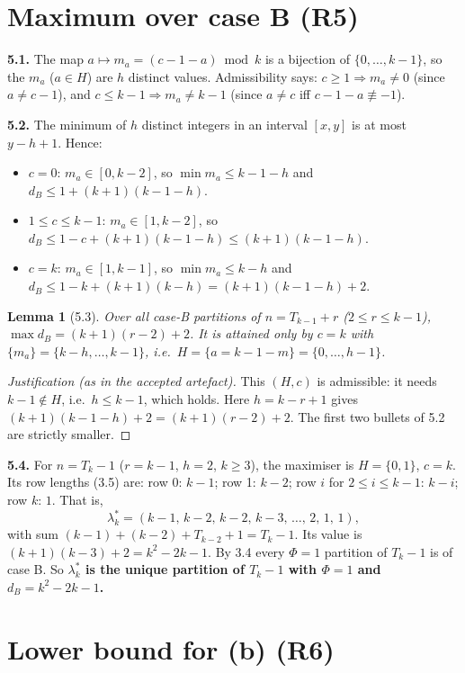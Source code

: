 \documentclass[11pt]{article}
\newtheorem{lemma}{Lemma}
\theoremstyle{remark}
\begin{document}
\section{Maximum over case B (R5)}

\textbf{5.1.} The map $a\mapsto m_a=(c-1-a)\bmod k$ is a bijection of $\{0,\dots,k-1\}$, so the $m_a$ ($a\in H$)
are $h$ distinct values. Admissibility says: $c\ge1\Rightarrow m_a\ne0$ (since $a\ne c-1$), and
$c\le k-1\Rightarrow m_a\ne k-1$ (since $a\ne c$ iff $c-1-a\not\equiv -1$).

\textbf{5.2.} The minimum of $h$ distinct integers in an interval $[x,y]$ is at most $y-h+1$. Hence:
\begin{itemize}
\item $c=0$: $m_a\in[0,k-2]$, so $\min m_a\le k-1-h$ and $d_B\le 1+(k+1)(k-1-h)$.
\item $1\le c\le k-1$: $m_a\in[1,k-2]$, so $d_B\le 1-c+(k+1)(k-1-h)\le (k+1)(k-1-h)$.
\item $c=k$: $m_a\in[1,k-1]$, so $\min m_a\le k-h$ and $d_B\le 1-k+(k+1)(k-h)=(k+1)(k-1-h)+2$.
\end{itemize}

\begin{lemma}[5.3]\label{lem:R5}
Over all case-B partitions of $n=T_{k-1}+r$ ($2\le r\le k-1$), $\max d_B=(k+1)(r-2)+2$. It is attained only by
$c=k$ with $\{m_a\}=\{k-h,\dots,k-1\}$, i.e.\ $H=\{a=k-1-m\}=\{0,\dots,h-1\}$.
\end{lemma}

\begin{proof}[Justification (as in the accepted artefact)]
This $(H,c)$ is admissible: it needs $k-1\notin H$, i.e.\ $h\le k-1$, which holds. Here $h=k-r+1$ gives
$(k+1)(k-1-h)+2=(k+1)(r-2)+2$. The first two bullets of 5.2 are strictly smaller.
\end{proof}

\textbf{5.4.} For $n=T_k-1$ ($r=k-1$, $h=2$, $k\ge3$), the maximiser is $H=\{0,1\}$, $c=k$. Its row lengths (3.5)
are: row 0: $k-1$; row 1: $k-2$; row $i$ for $2\le i\le k-1$: $k-i$; row $k$: $1$. That is,
\[
\lambda^*_k=(k-1,\,k-2,\,k-2,\,k-3,\,\dots,\,2,\,1,\,1),
\]
with sum $(k-1)+(k-2)+T_{k-2}+1=T_k-1$. Its value is $(k+1)(k-3)+2=k^2-2k-1$. By 3.4 every $\Phi=1$ partition of
$T_k-1$ is of case B. So \textbf{$\lambda^*_k$ is the unique partition of $T_k-1$ with $\Phi=1$ and
$d_B=k^2-2k-1$.}

\section{Lower bound for (b) (R6)}
\end{document}
